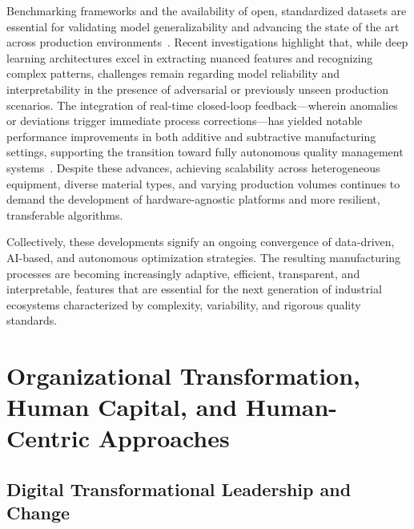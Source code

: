 Benchmarking frameworks and the availability of open, standardized datasets are essential for validating model generalizability and advancing the state of the art across production environments~\cite{ref46, ref48, ref53, ref95}. Recent investigations highlight that, while deep learning architectures excel in extracting nuanced features and recognizing complex patterns, challenges remain regarding model reliability and interpretability in the presence of adversarial or previously unseen production scenarios. The integration of real-time closed-loop feedback—wherein anomalies or deviations trigger immediate process corrections—has yielded notable performance improvements in both additive and subtractive manufacturing settings, supporting the transition toward fully autonomous quality management systems~\cite{ref44, ref48, ref58}. Despite these advances, achieving scalability across heterogeneous equipment, diverse material types, and varying production volumes continues to demand the development of hardware-agnostic platforms and more resilient, transferable algorithms.

Collectively, these developments signify an ongoing convergence of data-driven, AI-based, and autonomous optimization strategies. The resulting manufacturing processes are becoming increasingly adaptive, efficient, transparent, and interpretable, features that are essential for the next generation of industrial ecosystems characterized by complexity, variability, and rigorous quality standards.

\section{Organizational Transformation, Human Capital, and Human-Centric Approaches}

\subsection{Digital Transformational Leadership and Change}

